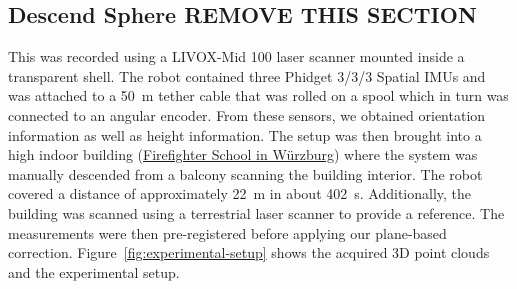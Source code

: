 	\subsection{Descend Sphere REMOVE THIS SECTION}

	This was recorded using a LIVOX-Mid 100 laser scanner mounted inside a transparent shell. 
	The robot contained three Phidget 3/3/3 Spatial IMUs and was attached to a \SI{50}{\meter} tether cable that was rolled on a spool which in turn was connected to an angular encoder. 
	From these sensors, we obtained orientation information as well as height information. 
	The setup was then brought into a high indoor building (\href{https://www.sfs-w.de/feuerwehrschule/virtueller-rundgang.html}{Firefighter School in Würzburg}) where the system was manually descended from a balcony scanning the building interior.
	The robot covered a distance of approximately \SI{22}{\meter} in about \SI{402}{\second}.
	Additionally, the building was scanned using a terrestrial laser scanner to provide a reference.
	The measurements were then pre-registered before applying our plane-based correction. 
	Figure~\ref{fig:experimental-setup} shows the acquired 3D point clouds and the experimental setup. 

